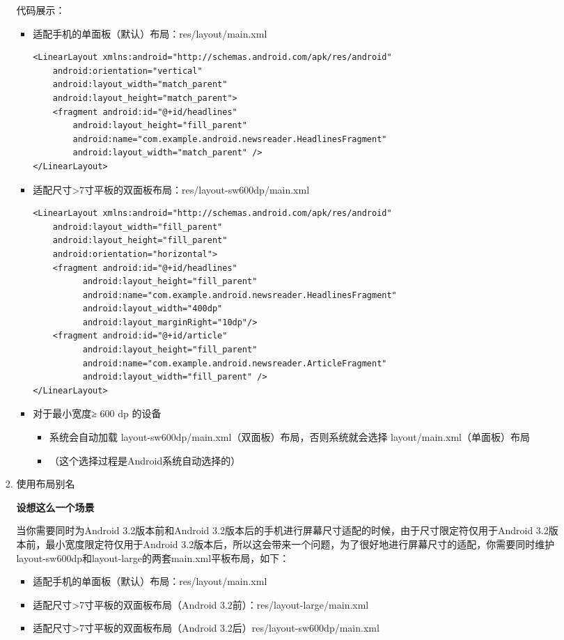 \documentclass[9pt, b5paper]{article}
\begin{document}
\begin{enumerate}
\begin{enumerate}
\begin{enumerate}
代码展示：
\begin{itemize}
\item 适配手机的单面板（默认）布局：res/layout/main.xml
\begin{verbatim}
<LinearLayout xmlns:android="http://schemas.android.com/apk/res/android"
    android:orientation="vertical"
    android:layout_width="match_parent"
    android:layout_height="match_parent">
    <fragment android:id="@+id/headlines"
        android:layout_height="fill_parent"
        android:name="com.example.android.newsreader.HeadlinesFragment"
        android:layout_width="match_parent" />
</LinearLayout>
\end{verbatim}
\item 适配尺寸>7寸平板的双面板布局：res/layout-sw600dp/main.xml
\begin{verbatim}
<LinearLayout xmlns:android="http://schemas.android.com/apk/res/android"
    android:layout_width="fill_parent"
    android:layout_height="fill_parent"
    android:orientation="horizontal">
    <fragment android:id="@+id/headlines"
          android:layout_height="fill_parent"
          android:name="com.example.android.newsreader.HeadlinesFragment"
          android:layout_width="400dp"
          android:layout_marginRight="10dp"/>
    <fragment android:id="@+id/article"
          android:layout_height="fill_parent"
          android:name="com.example.android.newsreader.ArticleFragment"
          android:layout_width="fill_parent" />
</LinearLayout>
\end{verbatim}
\item 对于最小宽度≥ 600 dp 的设备
\begin{itemize}
\item 系统会自动加载 layout-sw600dp/main.xml（双面板）布局，否则系统就会选择 layout/main.xml（单面板）布局
\item （这个选择过程是Android系统自动选择的）
\end{itemize}
\end{itemize}
\item 使用布局别名
\label{sec-6-6-1-1-2-3}

\textbf{设想这么一个场景}

当你需要同时为Android 3.2版本前和Android 3.2版本后的手机进行屏幕尺寸适配的时候，由于尺寸限定符仅用于Android 3.2版本前，最小宽度限定符仅用于Android 3.2版本后，所以这会带来一个问题，为了很好地进行屏幕尺寸的适配，你需要同时维护layout-sw600dp和layout-large的两套main.xml平板布局，如下：
\begin{itemize}
\item 适配手机的单面板（默认）布局：res/layout/main.xml
\item 适配尺寸>7寸平板的双面板布局（Android 3.2前）：res/layout-large/main.xml
\item 适配尺寸>7寸平板的双面板布局（Android 3.2后）res/layout-sw600dp/main.xml
\end{itemize}


\end{enumerate}
\end{enumerate}
\end{enumerate}
\end{document}
